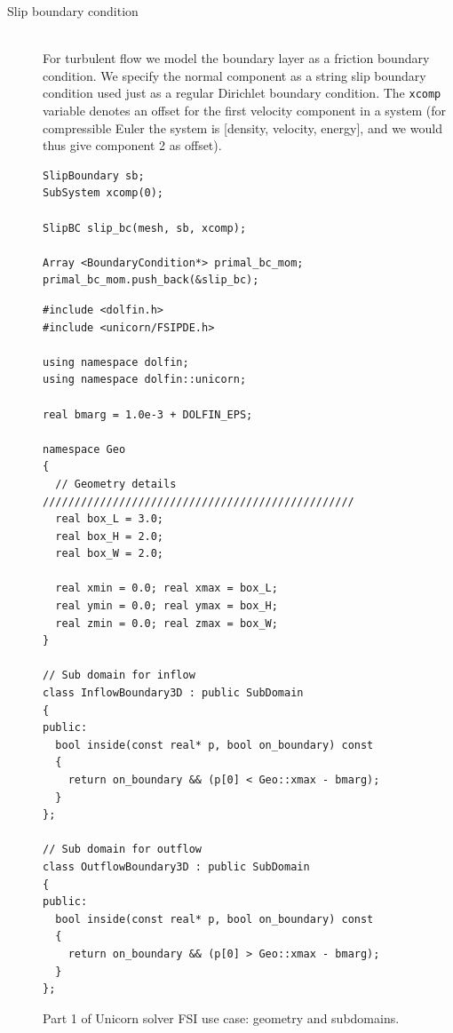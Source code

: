 \begin{description}

\item[Slip boundary condition]
\ \\
For turbulent flow we model the boundary layer as a friction boundary
condition. We specify the normal component as a string slip boundary
condition used just as a regular Dirichlet boundary condition. The
{\tt xcomp} variable denotes an offset for the first velocity
component in a system (for compressible Euler the system is [density,
velocity, energy], and we would thus give component 2 as offset).

\begin{lstlisting}
SlipBoundary sb;
SubSystem xcomp(0); 

SlipBC slip_bc(mesh, sb, xcomp);

Array <BoundaryCondition*> primal_bc_mom;
primal_bc_mom.push_back(&slip_bc);
\end{lstlisting}


\end{description}


\begin{figure}[!h]
\begin{lstlisting}
#include <dolfin.h>
#include <unicorn/FSIPDE.h>

using namespace dolfin;
using namespace dolfin::unicorn;

real bmarg = 1.0e-3 + DOLFIN_EPS;

namespace Geo
{
  // Geometry details /////////////////////////////////////////////////
  real box_L = 3.0;
  real box_H = 2.0;
  real box_W = 2.0;
  
  real xmin = 0.0; real xmax = box_L;
  real ymin = 0.0; real ymax = box_H;
  real zmin = 0.0; real zmax = box_W;
}

// Sub domain for inflow
class InflowBoundary3D : public SubDomain
{
public:
  bool inside(const real* p, bool on_boundary) const
  {
    return on_boundary && (p[0] < Geo::xmax - bmarg);
  }
};

// Sub domain for outflow
class OutflowBoundary3D : public SubDomain
{
public:
  bool inside(const real* p, bool on_boundary) const
  {
    return on_boundary && (p[0] > Geo::xmax - bmarg);
  }
};
\end{lstlisting}
\caption{Part 1 of Unicorn solver FSI use case: geometry and subdomains.}
\end{figure}

